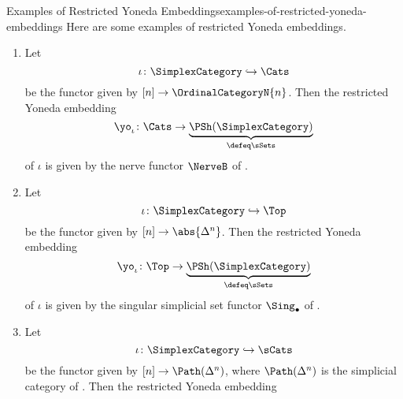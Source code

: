 \begin{example}{Examples of Restricted Yoneda Embeddings}{examples-of-restricted-yoneda-embeddings}%
    Here are some examples of restricted Yoneda embeddings.
    \begin{enumerate}
        \item\label{examples-of-restricted-yoneda-embeddings-the-nerve-functor}Let
            \[
                \iota%
                \colon%
                \SimplexCategory%
                \hookrightarrow%
                \Cats%
            \]%
            be the functor given by $[n]\to\OrdinalCategoryN{n}$. Then the restricted Yoneda embedding
            \[
                \yo_{\iota}%
                \colon%
                \Cats%
                \to%
                \underbrace{\PSh(\SimplexCategory)}_{\defeq\sSets}%
            \]%
            of $\iota$ is given by the nerve functor $\NerveB$ of .
        \item\label{examples-of-restricted-yoneda-embeddings-the-singular-complex-of-a-topological-space}Let
            \[
                \iota%
                \colon%
                \SimplexCategory%
                \hookrightarrow%
                \Top%
            \]%
            be the functor given by $[n]\to\abs{\Delta^{n}}$. Then the restricted Yoneda embedding
            \[
                \yo_{\iota}%
                \colon%
                \Top%
                \to%
                \underbrace{\PSh(\SimplexCategory)}_{\defeq\sSets}%
            \]%
            of $\iota$ is given by the singular simplicial set functor $\Sing_{\bullet}$ of .
        \item\label{examples-of-restricted-yoneda-embeddings-the-coherent-nerve-functor}Let
            \[
                \iota%
                \colon%
                \SimplexCategory%
                \hookrightarrow%
                \sCats%
            \]%
            be the functor given by $[n]\to\Path(\Delta^{n})$, where $\Path(\Delta^{n})$ is the simplicial category of . Then the restricted Yoneda embedding

\end{enumerate}
\end{example}
